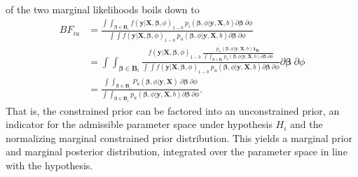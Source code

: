 \documentclass[
]{article}
\begin{document}
of the two marginal likelihoods boils down to \[
\begin{aligned}
BF_{iu} &= 
\frac{
  \int \int_{\boldsymbol{\beta} \in \boldsymbol{B}_i} f (\boldsymbol{y} | \boldsymbol{X}, \boldsymbol{\beta}, \phi)_{1-b} ~ p_i(\boldsymbol{\beta}, \phi | \boldsymbol{y}, \boldsymbol{X}, b) \partial \boldsymbol{\beta} ~ \partial \phi
}{
  \int \int f(\boldsymbol{y} | \boldsymbol{X}, \boldsymbol{\beta}, \phi)_{1-b} ~ p_u(\boldsymbol{\beta}, \phi | \boldsymbol{y}, \boldsymbol{X}, b) \partial \boldsymbol{\beta} ~ \partial \phi
} \\
&= \int \int_{\boldsymbol{\beta} \in \boldsymbol{B}_i} 
\frac{
  f (\boldsymbol{y} | \boldsymbol{X}, \boldsymbol{\beta}, \phi)_{1-b} ~  
  \frac{
    p_u (\boldsymbol{\beta}, \phi | \boldsymbol{y}, \boldsymbol{X}, b) \boldsymbol{1}_{\boldsymbol{B}_i}
  }{
    \int \int_{\boldsymbol{\beta} \in \boldsymbol{B}_i} p_u (\boldsymbol{\beta}, \phi | \boldsymbol{y}, \boldsymbol{X}, b) \partial \boldsymbol{\beta} ~ \partial \phi
  }
}{
  \int \int f(\boldsymbol{y} | \boldsymbol{X}, \boldsymbol{\beta}, \phi)_{1-b} ~ p_u(\boldsymbol{\beta}, \phi | \boldsymbol{y}, \boldsymbol{X}, b) \partial \boldsymbol{\beta} ~ \partial \phi
} \partial \boldsymbol{\beta} ~ \partial \phi \\
&= \frac{
   \int \int_{\boldsymbol{\beta} \in \boldsymbol{B}_i} P_u(\boldsymbol{\beta}, \phi| \boldsymbol{y}, \boldsymbol{X}) ~ \partial \boldsymbol{\beta} ~ \partial \phi
}{
  \int\int_{\boldsymbol{\beta} \in \boldsymbol{B}_i} p_u(\boldsymbol{\beta}, \phi | \boldsymbol{y}, \boldsymbol{X}, b) \partial \boldsymbol{\beta} ~ \partial \phi
}.
\end{aligned}
\] That is, the constrained prior can be factored into an unconstrained
prior, an indicator for the admissible parameter space under hypothesis
\(H_i\) and the normalizing marginal constrained prior distribution.
This yields a marginal prior and marginal posterior distribution,
integrated over the parameter space in line with the hypothesis.
\end{document}
